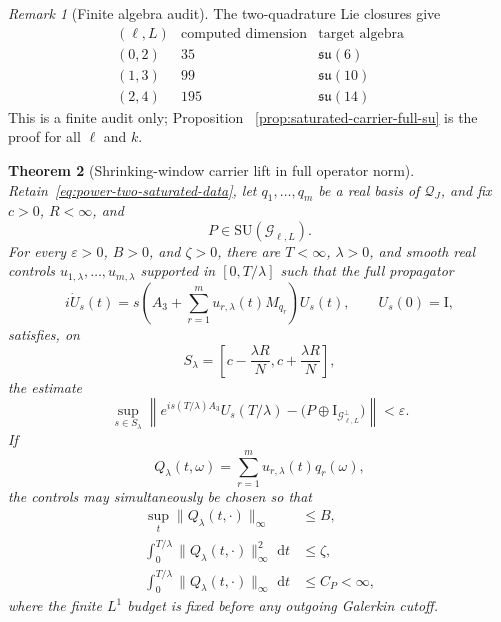 \documentclass[11pt]{article}
\newtheorem{theorem}{Theorem}[section]
\theoremstyle{remark}
\newtheorem{remark}[theorem]{Remark}
\newcommand{\Id}{\mathrm I}
\newcommand{\dd}{\,\mathrm d}
\begin{document}
\begin{remark}[Finite algebra audit]
The two-quadrature Lie closures give
\[
 \begin{array}{c|c|c}
  (\ell,L)&\text{computed dimension}&\text{target algebra}\\ \hline
  (0,2)&35&\mathfrak{su}(6)\\
  (1,3)&99&\mathfrak{su}(10)\\
  (2,4)&195&\mathfrak{su}(14)
 \end{array}
\]
This is a finite audit only; Proposition
~\ref{prop:saturated-carrier-full-su} is the proof for all $\ell$ and $k$.
\end{remark}

\begin{theorem}[Shrinking-window carrier lift in full operator norm]
\label{thm:shrinking-window-carrier-lift}
Retain~\eqref{eq:power-two-saturated-data}, let
$q_1,\ldots,q_m$ be a real basis of $\mathcal Q_J$, and fix
$c>0$, $R<\infty$, and
\[
 P\in\mathrm{SU}(\mathcal G_{\ell,L}).
\]
For every $\varepsilon>0$, $B>0$, and $\zeta>0$, there are
$T<\infty$, $\lambda>0$, and smooth real controls
$u_{1,\lambda},\ldots,u_{m,\lambda}$ supported in
$[0,T/\lambda]$ such that the full propagator
\begin{equation}
 i\dot U_s(t)=
 s\left(A_3+\sum_{r=1}^m
 u_{r,\lambda}(t)M_{q_r}\right)U_s(t),
 \qquad U_s(0)=\Id,
 \label{eq:shrinking-carrier-physical-system}
\end{equation}
satisfies, on
\begin{equation}
 S_\lambda=
 \left[c-\frac{\lambda R}{N},
       c+\frac{\lambda R}{N}\right],
 \label{eq:shrinking-carrier-window}
\end{equation}
the estimate
\begin{equation}
 \sup_{s\in S_\lambda}
 \left\|
 e^{is(T/\lambda)A_3}U_s(T/\lambda)
 -\bigl(P\oplus\Id_{\mathcal G_{\ell,L}^{\perp}}\bigr)
 \right\|<\varepsilon .
 \label{eq:shrinking-carrier-full-operator-gate}
\end{equation}
If
\[
 Q_\lambda(t,\omega)=
 \sum_{r=1}^mu_{r,\lambda}(t)q_r(\omega),
\]
the controls may simultaneously be chosen so that
\begin{align}
 \sup_t\|Q_\lambda(t,\cdot)\|_\infty&\leq B,
 \label{eq:shrinking-carrier-height}\\
 \int_0^{T/\lambda}\|Q_\lambda(t,\cdot)\|_\infty^2\,\dd t&\leq\zeta,
 \label{eq:shrinking-carrier-l2-cost}\\
 \int_0^{T/\lambda}\|Q_\lambda(t,\cdot)\|_\infty\,\dd t&\leq C_P<\infty,
 \label{eq:shrinking-carrier-l1-budget}
\end{align}
where the finite $L^1$ budget is fixed before any outgoing Galerkin cutoff.
\end{theorem}
\end{document}
